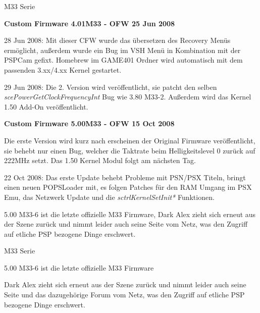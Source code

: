\documentclass[mode=print,paper=screen,size=10pt,style=paintings]{powerdot}
\begin{document}
\begin{slide}{M33 Serie}
	\begin{large}\textbf{Custom Firmware 4.01M33 - OFW 25 Jun 2008}\end{large}	
	\begin{list}{-}{}
		\item{28 Jun 2008: Mit dieser CFW wurde das übersetzen des Recovery Menüs ermöglicht, außerdem wurde ein Bug im VSH Menü
			in Kombination mit der PSPCam gefixt. Homebrew im GAME401 Ordner wird automatisch mit dem passenden 3.xx/4.xx Kernel
			gestartet.}
		\item{29 Jun 2008: Die 2. Version wird veröffentlicht, sie patcht den selben \textit{scePowerGetClockFrequencyInt} Bug 
			wie 3.80 M33-2. Außerdem wird das Kernel 1.50 Add-On veröffentlicht.}
	\end{list}
	\begin{large}\textbf{Custom Firmware 5.00M33 - OFW 15 Oct 2008}\end{large}	
	\begin{list}{-}{}
		\item{Die erste Version wird kurz nach erscheinen der Original Firmware veröffentlicht, sie behebt nur einen Bug, 
			welcher die Taktrate beim Helligkeitslevel 0 zurück auf 222MHz setzt. Das 1.50 Kernel Modul folgt am nächsten Tag.}
		\item{22 Oct 2008: Das erste Update behebt Probleme mit PSN/PSX Titeln, bringt einen neuen POPSLoader mit, es folgen
			Patches für den RAM Umgang im PSX Emu, das Netzwerk Update und die \textit{sctrlKernelSetInit*} Funktionen.}
		\item{5.00 M33-6 ist die letzte offizielle M33 Firmware, Dark Alex zieht sich erneut aus der Szene zurück und nimmt 
			leider auch seine Seite vom Netz, was den Zugriff auf etliche PSP bezogene Dinge erschwert.}
	\end{list}
\end{slide}

\begin{slide}{M33 Serie}
	\begin{list}{-}{}	
		\item{5.00 M33-6 ist die letzte offizielle M33 Firmware}
		\item{Dark Alex zieht sich erneut aus der Szene zurück und nimmt leider auch seine Seite und das dazugehörige Forum vom
			Netz, was den Zugriff auf etliche PSP bezogene Dinge erschwert.}
	\end{list}
\end{slide}
\end{document}
